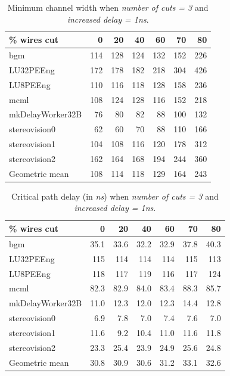 \documentclass{sig-alternate-2013}
\begin{document}
\begin{table}[!htbp]
\begin{tabular}{|l|r|r|r|r|r|r|}
\hline
\% wires cut & 0 & 20 & 40 & 60 & 70 & 80 \\ \hline \hline
bgm & 114 & 128 & 124 & 132 & 152 & 226 \\ \hline
LU32PEEng & 172 & 178 & 182 & 218 & 304 & 426 \\ \hline
LU8PEEng & 110 & 116 & 118 & 128 & 158 & 236 \\ \hline
mcml & 108 & 124 & 128 & 116 & 152 & 218 \\ \hline
mkDelayWorker32B & 76 & 80 & 82 & 88 & 100 & 132 \\ \hline
stereovision0 & 62 & 60 & 70 & 88 & 110 & 166 \\ \hline
stereovision1 & 104 & 108 & 116 & 120 & 178 & 312 \\ \hline
stereovision2 & 162 & 164 & 168 & 194 & 244 & 360 \\ \hline
Geometric mean & 108 & 114 & 118 & 129 & 164 & 243 \\ \hline
\end{tabular}
\caption{Minimum channel width when \textit{number of cuts = 3} and \textit{increased delay = 1ns}.}
\label{table:standard_minW}
\end{table}

\begin{table}[!htbp]
\begin{tabular}{|l|r|r|r|r|r|r|}
\hline
\% wires cut & 0 & 20 & 40 & 60 & 70 & 80 \\ \hline \hline
bgm & 35.1 & 33.6 & 32.2 & 32.9 & 37.8 & 40.3 \\ \hline
LU32PEEng & 115 & 114 & 114 & 114 & 115 & 113 \\ \hline
LU8PEEng & 118 & 117 & 119 & 116 & 117 & 124 \\ \hline
mcml & 82.3 & 82.9 & 84.0 & 83.4 & 88.3 & 85.7 \\ \hline
mkDelayWorker32B & 11.0 & 12.3 & 12.0 & 12.3 & 14.4 & 12.8 \\ \hline
stereovision0 & 6.9 & 7.8 & 7.0 & 7.4 & 7.6 & 7.0 \\ \hline
stereovision1 & 11.6 & 9.2 & 10.4 & 11.0 & 11.6 & 11.8 \\ \hline
stereovision2 & 23.3 & 25.4 & 23.9 & 24.9 & 25.6 & 24.8 \\ \hline
Geometric mean & 30.8 & 30.9 & 30.6 & 31.2 & 33.1 & 32.6 \\ \hline
\end{tabular}
\caption{Critical path delay (in \textit{ns}) when \textit{number of cuts = 3} and \textit{increased delay = 1ns}.}
\label{table:standard_path}
\end{table}
\end{document}

